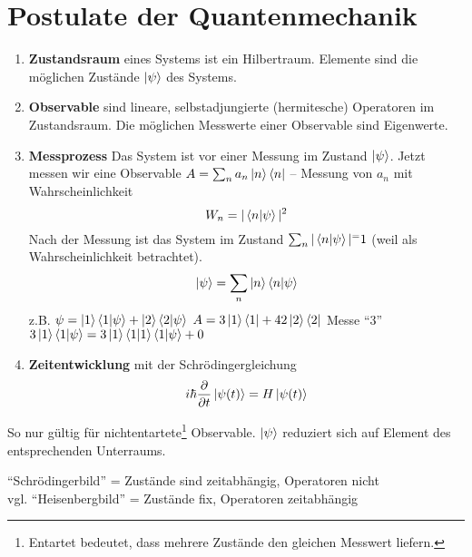 \section{Postulate der Quantenmechanik}
\begin{enumerate}[1)]
\item \textbf{Zustandsraum} eines Systems ist ein Hilbertraum. Elemente sind die möglichen Zustände $\ket{\psi}$ des Systems.
\item \textbf{Observable} sind lineare, selbstadjungierte (hermitesche) Operatoren im Zustandsraum. Die möglichen Messwerte einer Observable sind Eigenwerte.
\item \textbf{Messprozess} Das System ist vor einer Messung im Zustand $\ket{\psi}$. Jetzt messen wir eine Observable $A = \sum_n a_n \ket{n} \bra{n}$ – Messung von $a_n$ mit Wahrscheinlichkeit
$$W_n = |\braket{n | \psi}|^2$$
Nach der Messung ist das System im Zustand $\sum_n | \braket{n | \psi}|^ = 1$ (weil als Wahrscheinlichkeit betrachtet).
$$\ket{\psi} = \sum_n \ket{n}\braket{n | \psi}$$
z.B. $\psi = \ket{1}\braket{1 | \psi} + \ket{2}\braket{2 | \psi}$
$A = 3 \ket{1}\bra{1} + 42 \ket{2}\bra{2}$ Messe "`3"' \conseq $3 \ket{1}\braket{1 | \psi} = 3 \ket{1}\braket{1 | 1} \braket{1 | \psi} + 0$
\item \textbf{Zeitentwicklung} mit der Schrödingergleichung
$$ i\hbar \frac{\partial}{\partial t} \ket{\psi(t)} = H \ket{\psi(t)}$$
\end{enumerate}

\begin{bemerkung*}[zu 3)]
	So nur gültig für nichtentartete\footnote{Entartet bedeutet, dass mehrere Zustände den gleichen Messwert liefern.} Observable. \conseq $\ket{\psi}$ reduziert sich auf Element des entsprechenden Unterraums.
\end{bemerkung*}

\begin{bemerkung*}[zu 4)]
	"`Schrödingerbild"' = Zustände sind zeitabhängig, Operatoren nicht\\
	vgl. "`Heisenbergbild"' = Zustände fix, Operatoren zeitabhängig
\end{bemerkung*}


